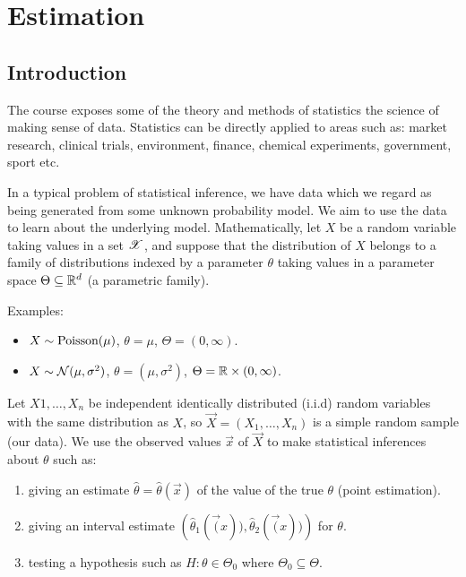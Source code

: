 
\chapter{Estimation}

\section{Introduction}
\label{sec:1.1}

The course exposes some of the theory and methods of statistics \textemdash{} the science of making sense of data. Statistics can be directly applied to areas such as: market research, clinical trials, environment, finance, chemical experiments, government, sport etc.

In a typical problem of statistical inference, we have data which we regard as being generated from some unknown probability model. We aim to use the data to learn about the underlying model. Mathematically, let $X$ be a random variable taking values in a set $\mathscr{X}$, and suppose that the distribution of $X$ belongs to a family of distributions indexed by a parameter $\theta$ taking values in a parameter space $\Theta \subseteq \mathbb{R}^d$ (a parametric family).

Examples:
\begin{itemize}
\item  $X \sim \text{Poisson} (\mu)$, $\theta = \mu$, $\Theta = (0, \infty)$.
\item $X \sim \mathcal{N}(\mu, \sigma^2)$, $\theta = (\mu, \sigma^2)$, $\Theta = \mathbb{R} \times (0, \infty)$.
\end{itemize}

Let $X1, \dotsc, X_n$  be independent identically distributed (i.i.d) random variables with the same distribution as $X$, so $\vec{X} = \left(X_1, \dotsc, X_n\right)$ is a simple random sample (our data). We use the observed values $\vec{x}$ of $\vec{X}$ to make statistical inferences about $\theta$ such as:
\begin{enumerate}
\item giving an estimate $\hat{\theta} = \hat{\theta}(\vec{x})$ of the value of the true $\theta$ (point estimation).
\item giving an interval estimate $\left(\hat{\theta}_1(\vec(x)), \hat{\theta}_2(\vec(x))\right)$ for $\theta$.
\item testing a hypothesis such as $H: \theta \in \Theta_0$ where $\Theta_0 \subseteq \Theta$.
\end{enumerate}

